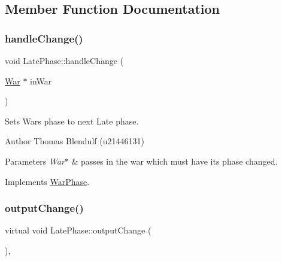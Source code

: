 \subsection{Member Function Documentation}
\mbox{\label{class_late_phase_afe61bf1d21b6534b674ce730cbdcd722}} 
\subsubsection{\texorpdfstring{handleChange()}{handleChange()}}
{\footnotesize\ttfamily void Late\+Phase\+::handle\+Change (\begin{DoxyParamCaption}\item[{\mbox{\hyperlink{class_war}{War}} $\ast$}]{in\+War }\end{DoxyParamCaption})\hspace{0.3cm}{\ttfamily [virtual]}}



Sets Wars phase to next Late phase. 

\begin{DoxyAuthor}{Author}
Thomas Blendulf (u21446131) 
\end{DoxyAuthor}

\begin{DoxyParams}{Parameters}
{\em War$\ast$} & passes in the war which must have its phase changed. \\
\hline
\end{DoxyParams}


Implements \mbox{\hyperlink{class_war_phase_a258e9480c7b3dcbdebdf86863659f1e5}{War\+Phase}}.

\mbox{\label{class_late_phase_a5df8ed1819ba8a826b923f7f3c349245}} 
\subsubsection{\texorpdfstring{outputChange()}{outputChange()}}
{\footnotesize\ttfamily virtual void Late\+Phase\+::output\+Change (\begin{DoxyParamCaption}{ }\end{DoxyParamCaption})\hspace{0.3cm}{\ttfamily [inline]}, {\ttfamily [virtual]}}



